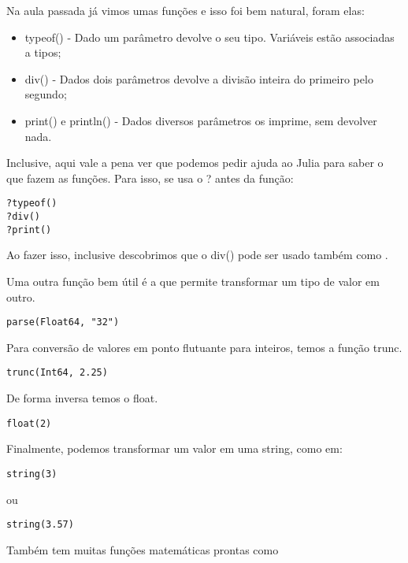 \documentclass[
  letterpaper,
  DIV=11,
  numbers=noendperiod]{scrreprt}
\begin{document}
Na aula passada já vimos umas funções e isso foi bem natural, foram
elas:

\begin{itemize}
\item
  typeof() - Dado um parâmetro devolve o seu tipo. Variáveis estão
  associadas a tipos;
\item
  div() - Dados dois parâmetros devolve a divisão inteira do primeiro
  pelo segundo;
\item
  print() e println() - Dados diversos parâmetros os imprime, sem
  devolver nada.
\end{itemize}

Inclusive, aqui vale a pena ver que podemos pedir ajuda ao Julia para
saber o que fazem as funções. Para isso, se usa o ? antes da função:

\begin{verbatim}
?typeof()
?div()
?print()
\end{verbatim}

Ao fazer isso, inclusive descobrimos que o div() pode ser usado também
como \div.

Uma outra função bem útil é a que permite transformar um tipo de valor
em outro.

\begin{verbatim}
parse(Float64, "32")
\end{verbatim}

Para conversão de valores em ponto flutuante para inteiros, temos a
função trunc.

\begin{verbatim}
trunc(Int64, 2.25)
\end{verbatim}

De forma inversa temos o float.

\begin{verbatim}
float(2)
\end{verbatim}

Finalmente, podemos transformar um valor em uma string, como em:

\begin{verbatim}
string(3)
\end{verbatim}

ou

\begin{verbatim}
string(3.57)
\end{verbatim}

Também tem muitas funções matemáticas prontas como
\end{document}
